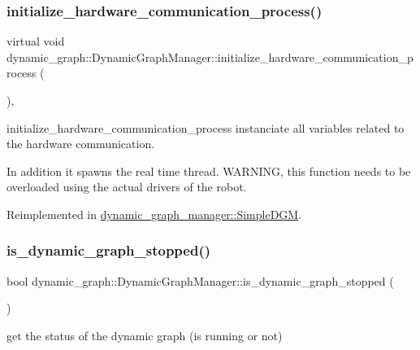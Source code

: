 \subsubsection{\texorpdfstring{initialize\+\_\+hardware\+\_\+communication\+\_\+process()}{initialize\_hardware\_communication\_process()}}
{\footnotesize\ttfamily virtual void dynamic\+\_\+graph\+::\+Dynamic\+Graph\+Manager\+::initialize\+\_\+hardware\+\_\+communication\+\_\+process (\begin{DoxyParamCaption}{ }\end{DoxyParamCaption})\hspace{0.3cm}{\ttfamily [inline]}, {\ttfamily [virtual]}}



initialize\+\_\+hardware\+\_\+communication\+\_\+process instanciate all variables related to the hardware communication. 

In addition it spawns the real time thread. W\+A\+R\+N\+I\+NG, this function needs to be overloaded using the actual drivers of the robot. 

Reimplemented in \hyperlink{classdynamic__graph__manager_1_1SimpleDGM_a5d771fc5a9ae6dd524a658d50fbee5d3}{dynamic\+\_\+graph\+\_\+manager\+::\+Simple\+D\+GM}.

\mbox{\label{classdynamic__graph_1_1DynamicGraphManager_ab929d21277e5d2fba726b8ae422c27a8}} 
\subsubsection{\texorpdfstring{is\+\_\+dynamic\+\_\+graph\+\_\+stopped()}{is\_dynamic\_graph\_stopped()}}
{\footnotesize\ttfamily bool dynamic\+\_\+graph\+::\+Dynamic\+Graph\+Manager\+::is\+\_\+dynamic\+\_\+graph\+\_\+stopped (\begin{DoxyParamCaption}{ }\end{DoxyParamCaption})\hspace{0.3cm}{\ttfamily [inline]}}



get the status of the dynamic graph (is running or not) 

